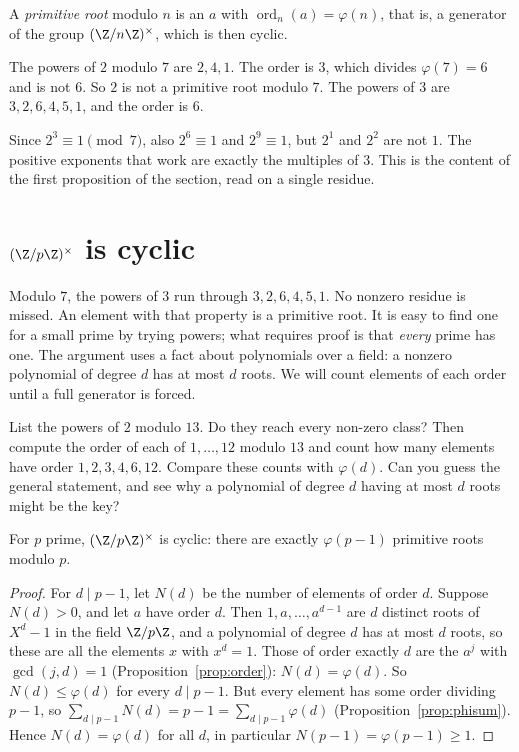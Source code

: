 A \emph{primitive root} modulo $n$ is an $a$ with $\operatorname{ord}_n(a)=\varphi(n)$, that is, a generator of the group $(\Z/n\Z)^\times$, which is then cyclic.

\begin{examplex}
The powers of $2$ modulo $7$ are $2,4,1$. The order is $3$, which divides $\varphi(7)=6$ and is not $6$. So $2$ is not a primitive root modulo $7$. The powers of $3$ are $3,2,6,4,5,1$, and the order is $6$.
\end{examplex}

\begin{examplex}
Since $2^3\equiv 1\pmod 7$, also $2^6\equiv 1$ and $2^9\equiv 1$, but $2^1$ and $2^2$ are not $1$. The positive exponents that work are exactly the multiples of $3$. This is the content of the first proposition of the section, read on a single residue.
\end{examplex}

\section{\texorpdfstring{$(\Z/p\Z)^\times$}{(Z/pZ)*} is cyclic}

Modulo $7$, the powers of $3$ run through $3,2,6,4,5,1$. No nonzero residue is missed. An element with that property is a primitive root. It is easy to find one for a small prime by trying powers; what requires proof is that \emph{every} prime has one. The argument uses a fact about polynomials over a field: a nonzero polynomial of degree $d$ has at most $d$ roots. We will count elements of each order until a full generator is forced.

\begin{think}
List the powers of $2$ modulo $13$. Do they reach every non-zero class? Then compute the order of each of $1,\dots,12$ modulo $13$ and count how many elements have order $1,2,3,4,6,12$. Compare these counts with $\varphi(d)$. Can you guess the general statement, and see why a polynomial of degree $d$ having at most $d$ roots might be the key?
\end{think}

\begin{theorem}[Gauss]\label{thm:cyclic}
For $p$ prime, $(\Z/p\Z)^\times$ is cyclic: there are exactly $\varphi(p-1)$ primitive roots modulo $p$.
\end{theorem}
\begin{proof}
For $d\mid p-1$, let $N(d)$ be the number of elements of order $d$. Suppose $N(d)>0$, and let $a$ have order $d$. Then $1,a,\dots,a^{d-1}$ are $d$ distinct roots of $X^d-1$ in the field $\Z/p\Z$, and a polynomial of degree $d$ has at most $d$ roots, so these are all the elements $x$ with $x^d=1$. Those of order exactly $d$ are the $a^j$ with $\gcd(j,d)=1$ (Proposition~\ref{prop:order}): $N(d)=\varphi(d)$.
So $N(d)\le\varphi(d)$ for every $d\mid p-1$. But every element has some order dividing $p-1$, so $\sum_{d\mid p-1}N(d)=p-1=\sum_{d\mid p-1}\varphi(d)$ (Proposition~\ref{prop:phisum}). Hence $N(d)=\varphi(d)$ for all $d$, in particular $N(p-1)=\varphi(p-1)\ge1$.
\end{proof}

